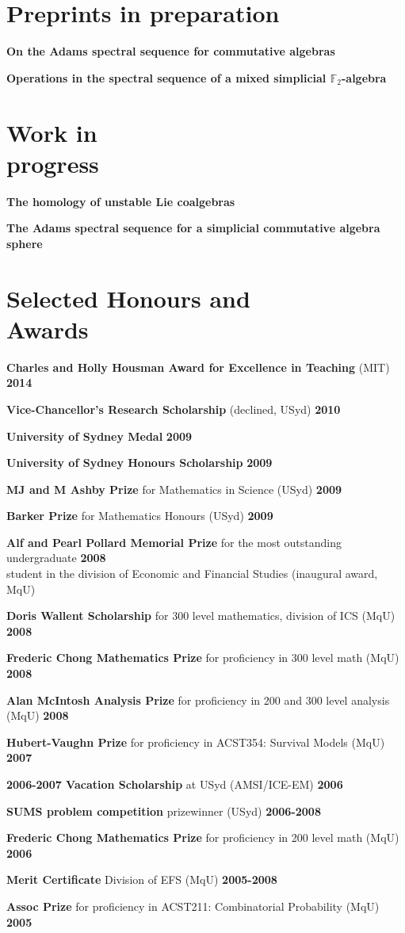 \documentclass[margin,line]{resume}
\newcommand{\award}[3]{\textbf{#1} #2 \hfill \textbf{#3}
           
\vspace{-2.3mm}}
\newcommand{\twolineaward}[4]{\textbf{#1} #2 \hfill \textbf{#4}\\%
#3
           
\vspace{-2.3mm}}
\begin{document}
\begin{resume}
\vspace{2mm}
        \section{\mysidestyle Preprints in preparation}

\award{On the Adams spectral sequence for commutative algebras}{}{}
\award{Operations in the spectral sequence of a mixed simplicial $\mathbb{F}_2$-algebra}{}{}

\vspace{2mm}

        \section{\mysidestyle Work in \\progress}

\award{The homology of unstable Lie coalgebras}{}{}
\award{The Adams spectral sequence for a simplicial commutative algebra
sphere}{}{}


\vspace{2mm}

    \section{\mysidestyle Selected Honours and\\Awards} 

\award{Charles and Holly Housman Award for Excellence in Teaching}{(MIT)}{2014}
\award{Vice-Chancellor's Research Scholarship}{(declined, USyd)}{2010}
\award{University of Sydney Medal}{}{2009}
\award{University of Sydney Honours Scholarship}{}{2009}
\award{MJ and M Ashby Prize}{for Mathematics in Science (USyd)}{2009}
\award{Barker Prize}{for Mathematics Honours (USyd)}{2009}
\twolineaward{Alf and Pearl Pollard Memorial Prize}{for the most outstanding undergraduate}{student in the division of Economic and Financial Studies (inaugural award, MqU)}{2008}
\award{Doris Wallent Scholarship}{for 300 level mathematics, division of ICS (MqU)}{2008}
\award{Frederic Chong Mathematics Prize}{for proficiency in 300 level math (MqU)}{2008}
\award{Alan McIntosh Analysis Prize}{for proficiency in 200 and 300 level analysis (MqU)}{2008}
\award{Hubert-Vaughn Prize}{for proficiency in ACST354: Survival Models (MqU)}{2007}
\award{2006-2007 Vacation Scholarship}{at USyd (AMSI/ICE-EM)}{2006}
\award{SUMS problem competition}{prizewinner (USyd)}{2006-2008}
\award{Frederic Chong Mathematics Prize}{for proficiency in 200 level math (MqU)}{2006}
\award{Merit Certificate}{Division of EFS (MqU)}{2005-2008}
\award{Assoc Prize}{for proficiency in ACST211: Combinatorial Probability (MqU)}{2005}


\end{resume}
\end{document}
